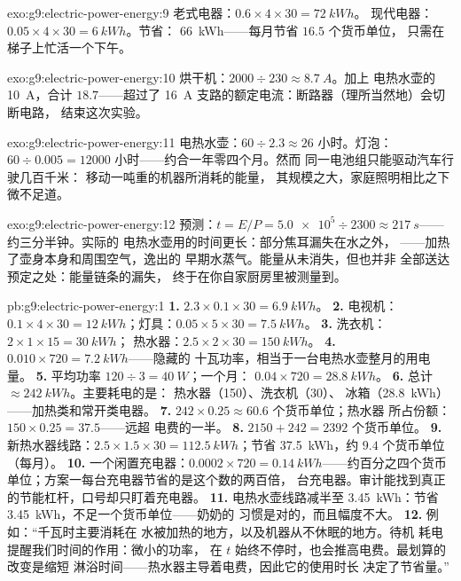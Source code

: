 \begin{solution}{exo:g9:electric-power-energy:9}
老式电器：$0.6 \times 4 \times 30 = \qty{72}{kWh}$。
现代电器：$0.05 \times 4 \times 30 = \qty{6}{kWh}$。节省：
\qty{66}{kWh}——每月节省 $16.5$ 个货币单位，
只需在梯子上忙活一个下午。
\end{solution}

\begin{solution}{exo:g9:electric-power-energy:10}
烘干机：$2000 \div 230 \approx \qty{8.7}{A}$。加上
电热水壶的 \qty{10}{A}，合计 $18.7$——超过了 \qty{16}{A}
支路的额定电流：断路器（理所当然地）会切断电路，
结束这次实验。
\end{solution}

\begin{solution}{exo:g9:electric-power-energy:11}
电热水壶：$60 \div 2.3 \approx 26$ 小时。灯泡：$60 \div
0.005 = 12000$ 小时——约合一年零四个月。然而
同一电池组只能驱动汽车行驶几百千米：
移动一吨重的机器所消耗的能量，
其规模之大，家庭照明相比之下微不足道。
\end{solution}

\begin{solution}{exo:g9:electric-power-energy:12}
预测：$t = E/P = \num{5.0e5} \div 2300 \approx
\qty{217}{s}$——约三分半钟。实际的
电热水壶用的时间更长：部分焦耳漏失在水之外，
——加热了壶身本身和周围空气，逸出的
早期水蒸气。能量从未消失，但也并非
全部送达预定之处：能量链条的漏失，
终于在你自家厨房里被测量到。
\end{solution}

\begin{solution}{pb:g9:electric-power-energy:1}
\textbf{1.} $2.3 \times 0.1 \times 30 = \qty{6.9}{kWh}$。
\textbf{2.} 电视机：$0.1 \times 4 \times 30 =
\qty{12}{kWh}$；灯具：$0.05 \times 5 \times 30 =
\qty{7.5}{kWh}$。
\textbf{3.} 洗衣机：$2 \times 1 \times 15 = \qty{30}{kWh}$；
热水器：$2.5 \times 2 \times 30 = \qty{150}{kWh}$。
\textbf{4.} $0.010 \times 720 = \qty{7.2}{kWh}$——隐藏的
十瓦功率，相当于一台电热水壶整月的用电量。
\textbf{5.} 平均功率 $120 \div 3 = \qty{40}{W}$；一个月：
$0.04 \times 720 = \qty{28.8}{kWh}$。
\textbf{6.} 总计 $\approx \qty{242}{kWh}$。主要耗电的是：
热水器（\qty{150}{}）、洗衣机（\qty{30}{}）、
冰箱（\qty{28.8}{kWh}）——加热类和常开类电器。
\textbf{7.} $242 \times 0.25 \approx 60.6$ 个货币单位；热水器
所占份额：$150 \times 0.25 = 37.5$——远超
电费的一半。
\textbf{8.} $2150 + 242 = 2392$ 个货币单位。
\textbf{9.} 新热水器线路：$2.5 \times 1.5 \times 30 =
\qty{112.5}{kWh}$；节省 \qty{37.5}{kWh}，约 $9.4$
个货币单位（每月）。
\textbf{10.} 一个闲置充电器：$0.0002 \times 720 =
\qty{0.14}{kWh}$——约百分之四个货币
单位；方案一每台充电器节省的是这个数的两百倍，
台充电器。审计能找到真正的节能杠杆，口号却只盯着充电器。
\textbf{11.} 电热水壶线路减半至 \qty{3.45}{kWh}：节省
\qty{3.45}{kWh}，不足一个货币单位——奶奶的
习惯是对的，而且幅度不大。
\textbf{12.} 例如：“千瓦时主要消耗在
水被加热的地方，以及机器从不休眠的地方。待机
耗电提醒我们时间的作用：微小的功率，
在 $t$ 始终不停时，也会推高电费。最划算的改变是缩短
淋浴时间——热水器主导着电费，因此它的使用时长
决定了节省量。”
\end{solution}
